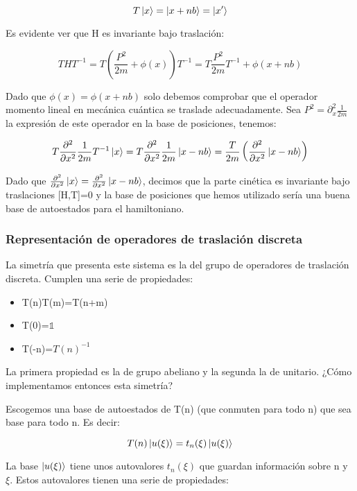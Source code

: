 \documentclass{article}
\begin{document}
$$T\ket{x}=\ket{x+nb}=\ket{x'}$$

Es evidente ver que H es invariante bajo traslación:

$$THT^{-1}=T\left( \frac{P^2}{2m}+\phi (x)\right)T^{-1}=T \frac{P^2}{2m}T^{-1}+\phi (x+nb)$$

Dado que $\phi (x)=\phi (x+nb)$ solo debemos comprobar que el operador momento lineal en mecánica cuántica se traslade adecuadamente. Sea $P^2=\partial ^2_x\frac{1}{2m}$ la expresión de este operador en la base de posiciones, tenemos:

$$T\frac{\partial ^2}{\partial x^2}\frac{1}{2m}T^{-1}\ket{x}=T\frac{\partial ^2}{\partial x^2}\frac{1}{2m}\ket{x-nb}=\frac{T}{2m}\left ( \frac{\partial ^2}{\partial x^2}\ket{x-nb}\right)$$

Dado que $\frac{\partial ^2}{\partial x^2}\ket{x}=\frac{\partial ^2}{\partial x^2}\ket{x-nb}$, decimos que la parte cinética es invariante bajo traslaciones [H,T]=0 y la base de posiciones que hemos utilizado sería una buena base de autoestados para el hamiltoniano.

\newpage
\subsubsection{Representación de operadores de traslación discreta}
La simetría que presenta este sistema es la del grupo de operadores de traslación discreta. Cumplen una serie de propiedades:

\begin{itemize}

\item T(n)T(m)=T(n+m)

\item T(0)=$\mathds{1}$

\item T(-n)=$T(n)^{-1}$

\end{itemize}

La primera propiedad es la de grupo abeliano y la segunda la de unitario. ¿Cómo implementamos entonces esta simetría?

Escogemos una base de autoestados de T(n) (que conmuten para todo n) que sea base para todo n. Es decir:

$$T(n) \ket{u(\xi)}=t_n(\xi)\ket{u(\xi)}$$

La base $\ket{u(\xi)}$ tiene unos autovalores $t_n(\xi)$ que guardan información sobre n y $\xi$. Estos autovalores tienen una serie de propiedades:
\end{document}
